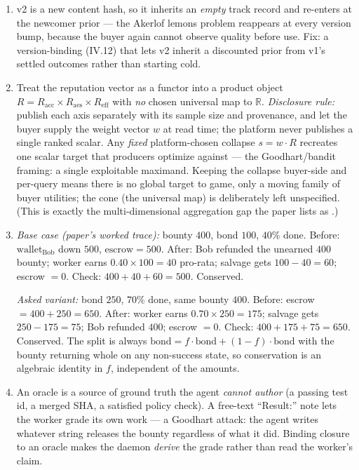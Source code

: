 \begin{enumerate}[label=\textbf{IV.\arabic*},leftmargin=2.8em,itemsep=8pt,topsep=4pt]
\item \wbtrace v2 is a new content hash, so it inherits an \emph{empty} track record
  and re-enters at the newcomer prior --- the Akerlof lemons problem reappears at
  every version bump, because the buyer again cannot observe quality before use.
  Fix: a version-binding (IV.12) that lets v2 inherit a discounted prior from v1's
  settled outcomes rather than starting cold.

\item \wbopen\wbstar Treat the reputation vector as a functor into a product object
  $R = R_{\mathrm{acc}}\times R_{\mathrm{aes}}\times R_{\mathrm{eff}}$ with \emph{no}
  chosen universal map to $\mathbb{R}$. \emph{Disclosure rule:} publish each axis
  separately with its sample size and provenance, and let the buyer supply the weight
  vector $w$ at read time; the platform never publishes a single ranked scalar.
  Any \emph{fixed} platform-chosen collapse $s = w\cdot R$ recreates one scalar
  target that producers optimize against --- the Goodhart/bandit framing: a single
  exploitable maximand. Keeping the collapse buyer-side and per-query means there is
  no global target to game, only a moving family of buyer utilities; the cone (the
  universal map) is deliberately left unspecified. (This is exactly the
  multi-dimensional aggregation gap the paper lists as \openmark{}.)

\item \wbtrace \emph{Base case (paper's worked trace):} bounty $400$, bond $100$,
  $40\%$ done. Before: $\text{wallet}_{\text{Bob}}$ down $500$, $\text{escrow}=500$.
  After: Bob refunded the unearned $400$ bounty; worker earns
  $0.40\times100=40$ pro-rata; salvage gets $100-40=60$; escrow $=0$. Check:
  $400+40+60=500$. Conserved.\par
  \emph{Asked variant:} bond $250$, $70\%$ done, same bounty $400$. Before:
  escrow $=400+250=650$. After: worker earns $0.70\times250=175$; salvage gets
  $250-175=75$; Bob refunded $400$; escrow $=0$. Check: $400+175+75=650$. Conserved.
  The split is always $\text{bond}=f\cdot\text{bond}+(1-f)\cdot\text{bond}$ with the
  bounty returning whole on any non-success state, so conservation is an algebraic
  identity in $f$, independent of the amounts.

\item \wbcheck An oracle is a source of ground truth the agent \emph{cannot author}
  (a passing test id, a merged SHA, a satisfied policy check). A free-text
  ``Result:'' note lets the worker grade its own work --- a Goodhart attack: the
  agent writes whatever string releases the bounty regardless of what it did. Binding
  closure to an oracle makes the daemon \emph{derive} the grade rather than read the
  worker's claim.


\end{enumerate}
